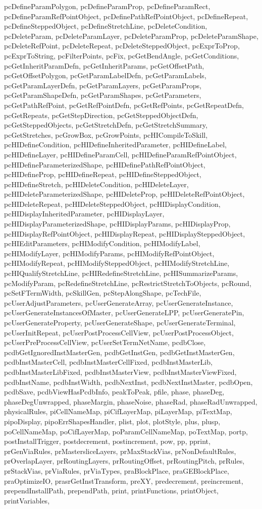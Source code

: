 {{pcDefineParamPolygon, pcDefineParamProp, pcDefineParamRect, pcDefineParamRefPointObject, pcDefinePathRefPointObject, pcDefineRepeat, pcDefineSteppedObject, pcDefineStretchLine, pcDeleteCondition, pcDeleteParam, pcDeleteParamLayer, pcDeleteParamProp, pcDeleteParamShape, pcDeleteRefPoint, pcDeleteRepeat, pcDeleteSteppedObject, pcExprToProp, pcExprToString, pcFilterPoints, pcFix, pcGetBendAngle, pcGetConditions, pcGetInheritParamDefn, pcGetInheritParams, pcGetOffsetPath, pcGetOffsetPolygon, pcGetParamLabelDefn, pcGetParamLabels, pcGetParamLayerDefn, pcGetParamLayers, pcGetParamProps, pcGetParamShapeDefn, pcGetParamShapes, pcGetParameters, pcGetPathRefPoint, pcGetRefPointDefn, pcGetRefPoints, pcGetRepeatDefn, pcGetRepeats, pcGetStepDirection, pcGetSteppedObjectDefn, pcGetSteppedObjects, pcGetStretchDefn, pcGetStretchSummary, pcGetStretches, pcGrowBox, pcGrowPoints, pcHICompileToSkill, pcHIDefineCondition, pcHIDefineInheritedParameter, pcHIDefineLabel, pcHIDefineLayer, pcHIDefineParamCell, pcHIDefineParamRefPointObject, pcHIDefineParameterizedShape, pcHIDefinePathRefPointObject, pcHIDefineProp, pcHIDefineRepeat, pcHIDefineSteppedObject, pcHIDefineStretch, pcHIDeleteCondition, pcHIDeleteLayer, pcHIDeleteParameterizedShape, pcHIDeleteProp, pcHIDeleteRefPointObject, pcHIDeleteRepeat, pcHIDeleteSteppedObject, pcHIDisplayCondition, pcHIDisplayInheritedParameter, pcHIDisplayLayer, pcHIDisplayParameterizedShape, pcHIDisplayParams, pcHIDisplayProp, pcHIDisplayRefPointObject, pcHIDisplayRepeat, pcHIDisplaySteppedObject, pcHIEditParameters, pcHIModifyCondition, pcHIModifyLabel, pcHIModifyLayer, pcHIModifyParams, pcHIModifyRefPointObject, pcHIModifyRepeat, pcHIModifySteppedObject, pcHIModifyStretchLine, pcHIQualifyStretchLine, pcHIRedefineStretchLine, pcHISummarizeParams, pcModifyParam, pcRedefineStretchLine, pcRestrictStretchToObjects, pcRound, pcSetFTermWidth, pcSkillGen, pcStepAlongShape, pcTechFile, pcUserAdjustParameters, pcUserGenerateArray, pcUserGenerateInstance, pcUserGenerateInstancesOfMaster, pcUserGenerateLPP, pcUserGeneratePin, pcUserGenerateProperty, pcUserGenerateShape, pcUserGenerateTerminal, pcUserInitRepeat, pcUserPostProcessCellView, pcUserPostProcessObject, pcUserPreProcessCellView, pcUserSetTermNetName, pcdbClose, pcdbGetIgnoredInstMasterGen, pcdbGetInstGen, pcdbGetInstMasterGen, pcdbInstMasterCell, pcdbInstMasterCellFixed, pcdbInstMasterLib, pcdbInstMasterLibFixed, pcdbInstMasterView, pcdbInstMasterViewFixed, pcdbInstName, pcdbInstWidth, pcdbNextInst, pcdbNextInstMaster, pcdbOpen, pcdbSave, pcdbViewHasPcdbInfo, peakToPeak, pfile, phase, phaseDeg, phaseDegUnwrapped, phaseMargin, phaseNoise, phaseRad, phaseRadUnwrapped, physicalRules, piCellNameMap, piCifLayerMap, piLayerMap, piTextMap, pipoDisplay, pipoErrShapesHandler, plist, plot, plotStyle, plus, plusp, poCellNameMap, poCifLayerMap, poParamCellNameMap, poTextMap, portp, postInstallTrigger, postdecrement, postincrement, pow, pp, pprint, prGenViaRules, prMastersliceLayers, prMaxStackVias, prNonDefaultRules, prOverlapLayer, prRoutingLayers, prRoutingOffset, prRoutingPitch, prRules, prStackVias, prViaRules, prViaTypes, praBlockPlace, praGEBlockPlace, praOptimizeIO, prasrGetInstTransform, preXY, predecrement, preincrement, prependInstallPath, prependPath, print, printFunctions, printObject, printVariables, }}
